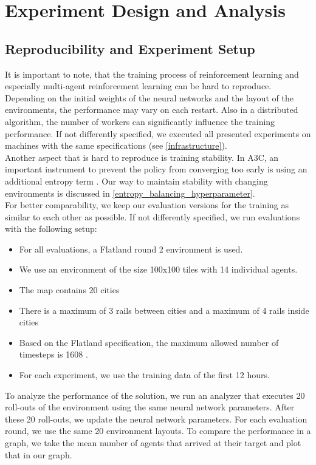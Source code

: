 \chapter{Experiment Design and Analysis}
\label{chap.experiment}

\section[Reproducibility]{Reproducibility and Experiment Setup}\label{reproducability}
It is important to note, that the training process of reinforcement learning and especially multi-agent reinforcement learning can be hard to reproduce. Depending on the initial weights of the neural networks and the layout of the environments, the performance may vary on each restart. Also in a distributed algorithm, the number of workers can significantly influence the training performance. If not differently specified, we executed all presented experiments on machines with the same specifications (see \autoref{infrastructure}).\\
Another aspect that is hard to reproduce is training stability. In A3C, an important instrument to prevent the policy from converging too early is using an additional entropy term \cite{a3c}. Our way to maintain stability with changing environments is discussed in \autoref{entropy_balancing_hyperparameter}.\\
For better comparability, we keep our evaluation versions for the training as similar to each other as possible. If not differently specified, we run evaluations with the following setup:
\begin{itemize}
	\item For all evaluations, a Flatland round 2 environment is used.
	\item We use an environment of the size 100x100 tiles with 14 individual agents.
	\item The map contains 20 cities
	\item There is a maximum of 3 rails between cities and a maximum of 4 rails inside cities
	\item Based on the Flatland specification, the maximum allowed number of timesteps is 1608 \cite{flatland_spec}.
	\item For each experiment, we use the training data of the first 12 hours.
\end{itemize}
To analyze the performance of the solution, we run an analyzer that executes 20 roll-outs of the environment using the same neural network parameters. After these 20 roll-outs, we update the neural network parameters. For each evaluation round, we use the same 20 environment layouts.
To compare the performance in a graph, we take the mean number of agents that arrived at their target and plot that in our graph.

